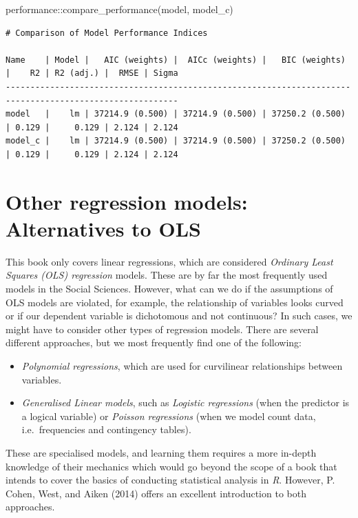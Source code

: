\documentclass[
  letterpaper,
]{krantz}
\makeatletter
\newenvironment{Shaded}{\begin{snugshade}}{\end{snugshade}}
\newcommand{\FunctionTok}[1]{\textcolor[rgb]{0.28,0.35,0.67}{#1}}
\newcommand{\NormalTok}[1]{\textcolor[rgb]{0.00,0.23,0.31}{#1}}
\newcommand{\SpecialCharTok}[1]{\textcolor[rgb]{0.37,0.37,0.37}{#1}}
\newenvironment{kframe}{%
\medskip{}
\setlength{\fboxsep}{.8em}
 \def\at@end@of@kframe{}%
 \ifinner\ifhmode%
  \def\at@end@of@kframe{\end{minipage}}%
  \begin{minipage}{\columnwidth}%
 \fi\fi%
 \def\FrameCommand##1{\hskip\@totalleftmargin \hskip-\fboxsep
 \colorbox{shadecolor}{##1}\hskip-\fboxsep
     \hskip-\linewidth \hskip-\@totalleftmargin \hskip\columnwidth}%
 \MakeFramed {\advance\hsize-\width
   \@totalleftmargin\z@ \linewidth\hsize
   \@setminipage}}%
 {\par\unskip\endMakeFramed%
 \at@end@of@kframe}
\renewenvironment{Shaded}{\begin{kframe}}{\end{kframe}}
\makeatother
\begin{document}
\begin{Shaded}
\begin{Highlighting}[]
\NormalTok{performance}\SpecialCharTok{::}\FunctionTok{compare\_performance}\NormalTok{(model, model\_c)}
\end{Highlighting}
\end{Shaded}

\begin{verbatim}
# Comparison of Model Performance Indices

Name    | Model |   AIC (weights) |  AICc (weights) |   BIC (weights) |    R2 | R2 (adj.) |  RMSE | Sigma
---------------------------------------------------------------------------------------------------------
model   |    lm | 37214.9 (0.500) | 37214.9 (0.500) | 37250.2 (0.500) | 0.129 |     0.129 | 2.124 | 2.124
model_c |    lm | 37214.9 (0.500) | 37214.9 (0.500) | 37250.2 (0.500) | 0.129 |     0.129 | 2.124 | 2.124
\end{verbatim}

\section{Other regression models: Alternatives to
OLS}\label{sec-ols-alternatives}

This book only covers linear regressions, which are considered
\emph{Ordinary Least Squares (OLS) regression} models. These are by far
the most frequently used models in the Social Sciences. However, what
can we do if the assumptions of OLS models are violated, for example,
the relationship of variables looks curved or if our dependent variable
is dichotomous and not continuous? In such cases, we might have to
consider other types of regression models. There are several different
approaches, but we most frequently find one of the following:

\begin{itemize}
\item
  \emph{Polynomial regressions}, which are used for curvilinear
  relationships between variables.
\item
  \emph{Generalised Linear models}, such as \emph{Logistic regressions}
  (when the predictor is a logical variable) or \emph{Poisson
  regressions} (when we model count data, i.e.~frequencies and
  contingency tables).
\end{itemize}

These are specialised models, and learning them requires a more in-depth
knowledge of their mechanics which would go beyond the scope of a book
that intends to cover the basics of conducting statistical analysis in
\emph{R}. However, P. Cohen, West, and Aiken (2014) offers an excellent
introduction to both approaches.
\end{document}
